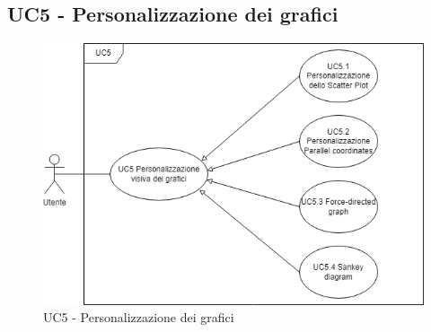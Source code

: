 \newpage


\subsection{UC5 - Personalizzazione dei grafici}
\begin{figure}[h!]
	\centering
	\includegraphics[scale=0.55]{../../assets/personalizzazioneVisivaGrafici.drawio.png}
	\caption{UC5 - Personalizzazione dei grafici}
\end{figure}
